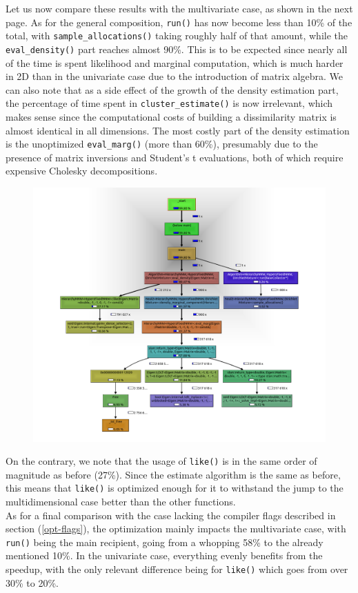 Let us now compare these results with the multivariate case, as shown in the next page. %
As for the general composition, \verb|run()| has now become less than 10\% of the total, with \verb|sample_allocations()| taking roughly half of that amount, while the \verb|eval_density()| part reaches almost 90\%.
This is to be expected since nearly all of the time is spent likelihood and marginal computation, which is much harder in 2D than in the univariate case due to the introduction of matrix algebra.
We can also note that as a side effect of the growth of the density estimation part, the percentage of time spent in \verb|cluster_estimate()| is now irrelevant, which makes sense since the computational costs of building a dissimilarity matrix is almost identical in all dimensions.
The most costly part of the density estimation is the unoptimized \verb|eval_marg()| (more than 60\%), presumably due to the presence of matrix inversions and Student's t evaluations, both of which require expensive Cholesky decompositions.
\begin{figure}[h]
	\hspace{-60pt}
	\includegraphics[scale=0.45]{etc/kcg_multi.png}
\end{figure}
On the contrary, we note that the usage of \verb|like()| is in the same order of magnitude as before (27\%).
Since the estimate algorithm is the same as before, this means that \verb|like()| is optimized enough for it to withstand the jump to the multidimensional case better than the other functions. \\
As for a final comparison with the case lacking the compiler flags described in section (\ref{opt-flags}), the optimization mainly impacts the multivariate case, with \verb|run()| being the main recipient, going from a whopping 58\% to the already mentioned 10\%.
In the univariate case, everything evenly benefits from the speedup, with the only relevant difference being for \verb|like()| which goes from over 30\% to 20\%.


